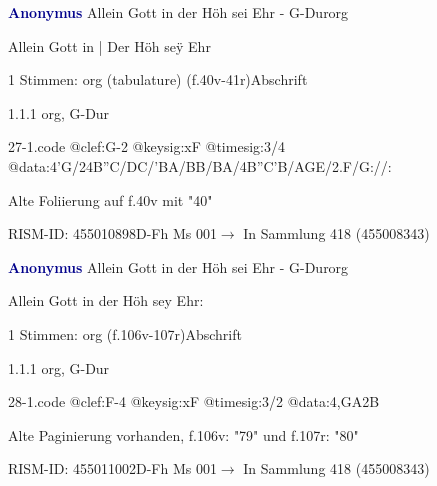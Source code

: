 \documentclass[twocolumn]{book}
\begin{document}
\par \vspace{7pt} \textcolor{darkblue}{\textbf{Anonymus  }}\hfillplus{\textbf{[27]}}\newline Allein Gott in der Höh sei Ehr - G-Dur\newline org
\par \begin{itshape}[f.40v, at left:] Allein Gott in | Der Höh seÿ Ehr\end{itshape} 
\par \textcolor{darkblue}{}  1 Stimmen: org (tabulature)  (f.40v-41r)\newline Abschrift
\par 1.1.1  org, G-Dur  
\begin{filecontents*}{27-1.code}
@clef:G-2
@keysig:xF
@timesig:3/4
@data:4'G/24B''C/DC/'BA/BB/BA/4B''C'B/AGE/2.F/G://:
\end{filecontents*}
\newline
%
\par Alte Foliierung auf f.40v mit "40"
\par RISM-ID: 455010898\newline D-Fh  Ms 001\newline $\rightarrow$ In Sammlung 418 (455008343)
      
\par \vspace{7pt} \textcolor{darkblue}{\textbf{Anonymus  }}\hfillplus{\textbf{[28]}}\newline Allein Gott in der Höh sei Ehr - G-Dur\newline org
\par \begin{itshape}[f.106v, heading:] Allein Gott in der Höh sey Ehr:\end{itshape} 
\par \textcolor{darkblue}{}  1 Stimmen: org  (f.106v-107r)\newline Abschrift
\par 1.1.1  org, G-Dur  
\begin{filecontents*}{28-1.code}
@clef:F-4
@keysig:xF
@timesig:3/2
@data:4,GA2B%
\end{filecontents*}
\newline
%
\par Alte Paginierung vorhanden, f.106v: "79" und f.107r: "80"
\par RISM-ID: 455011002\newline D-Fh  Ms 001\newline $\rightarrow$ In Sammlung 418 (455008343)
      
\end{document}
